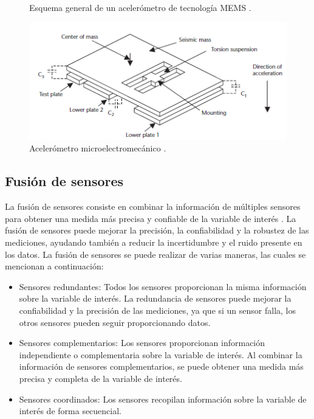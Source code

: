 \begin{itemize}
\begin{itemize}
\begin{figure}[H]
\begin{minipage}{0.45\textwidth}
                    \caption{Esquema general de un acelerómetro de tecnología MEMS \citep{dunn2005introduction}.}
                    \label{fig:acc-mems1}
                \end{minipage}
                \hfill
                \begin{minipage}{0.45\textwidth}
                    \centering
                    \includegraphics[width=1\textwidth]{imagenes/cap1_marcoteo/AccelerometerMEMS2.png}
                    \caption{Acelerómetro microelectromecánico \citep{dunn2005introduction}.}
                    \label{fig:acc-mems2}
                \end{minipage}
            \end{figure}
        \end{itemize}

    \end{itemize}

\subsection{Fusión de sensores}
\label{subsec:sensorfusion}

La fusión de sensores consiste en combinar la información de múltiples sensores para obtener una medida más precisa y confiable de la variable de interés \citep{lamkin2019sensors}. La fusión de sensores puede mejorar la precisión, la confiabilidad y la robustez de las mediciones, ayudando también a reducir la incertidumbre y el ruido presente en los datos. La fusión de sensores se puede realizar de varias maneras, las cuales se mencionan a continuación:

\begin{itemize}
    \item Sensores redundantes: Todos los sensores proporcionan la misma información sobre la variable de interés. La redundancia de sensores puede mejorar la confiabilidad y la precisión de las mediciones, ya que si un sensor falla, los otros sensores pueden seguir proporcionando datos.
    
    \item Sensores complementarios: Los sensores proporcionan información independiente o complementaria sobre la variable de interés. Al combinar la información de sensores complementarios, se puede obtener una medida más precisa y completa de la variable de interés.
    \item Sensores coordinados: Los sensores recopilan información sobre la variable de interés de forma secuencial. 
\end{itemize}

